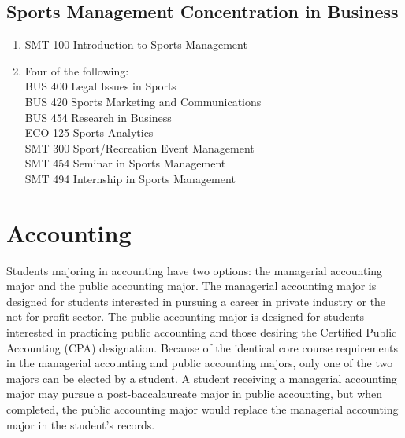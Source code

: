 \documentclass[
  letterpaper,
]{scrbook}
\providecommand{\tightlist}{%
  \setlength{\itemsep}{0pt}\setlength{\parskip}{0pt}}
\begin{document}
\subsection{Sports Management Concentration in
Business}\label{sec-sports-management-concentration}

\begin{enumerate}
\def\labelenumi{\arabic{enumi}.}
\tightlist
\item
  SMT 100 Introduction to Sports Management\\
\item
  Four of the following:\\
  BUS 400 Legal Issues in Sports\\
  BUS 420 Sports Marketing and Communications\\
  BUS 454 Research in Business\\
  ECO 125 Sports Analytics\\
  SMT 300 Sport/Recreation Event Management\\
  SMT 454 Seminar in Sports Management\\
  SMT 494 Internship in Sports Management
\end{enumerate}

\section{Accounting}\label{sec-accounting}

Students majoring in accounting have two options: the managerial
accounting major and the public accounting major. The managerial
accounting major is designed for students interested in pursuing a
career in private industry or the not-for-profit sector. The public
accounting major is designed for students interested in practicing
public accounting and those desiring the Certified Public Accounting
(CPA) designation. Because of the identical core course requirements in
the managerial accounting and public accounting majors, only one of the
two majors can be elected by a student. A student receiving a managerial
accounting major may pursue a post-baccalaureate major in public
accounting, but when completed, the public accounting major would
replace the managerial accounting major in the student's records.
\end{document}
